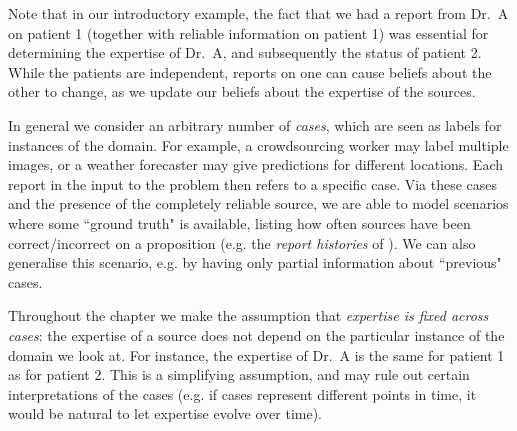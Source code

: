 
Note that in our introductory example, the fact that we had a report from Dr.\ A
on patient 1 (together with reliable information on patient 1) was essential
for determining the expertise of Dr.\ A, and subsequently the status of patient
2. While the patients are independent, reports on one can cause beliefs about
the other to change, as we update our beliefs about the expertise of the
sources.

In general we consider an arbitrary number of \emph{cases}, which are
seen as labels for instances of the domain. For example, a crowdsourcing worker
may label multiple images, or a weather forecaster may give predictions for
different locations. Each report in the input to the
problem then refers to a specific case. Via these cases and the presence of the
completely reliable source, we are able to model scenarios where some ``ground
truth" is available, listing how often sources have been correct/incorrect on a
proposition (e.g. the \emph{report histories} of
\textcite{hunter_building_21}). We can also generalise this scenario, e.g. by
having only partial information about ``previous" cases.

Throughout the chapter we make the assumption that \emph{expertise is fixed
across cases}: the expertise of a source does not depend on the particular
instance of the domain we look at. For instance, the expertise of Dr.\ A is the
same for patient 1 as for patient 2. This is a simplifying assumption, and may
rule out certain interpretations of the cases (e.g. if cases represent
different points in time, it would be natural to let expertise evolve over
time).


